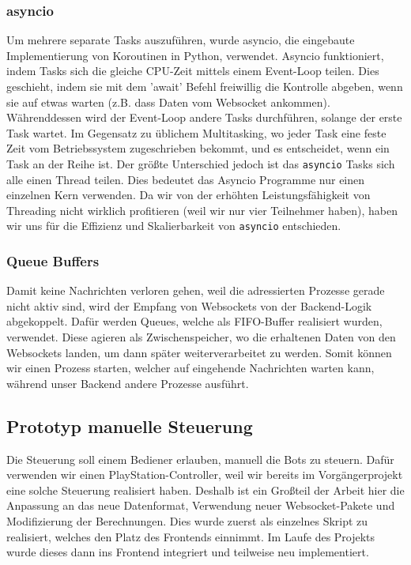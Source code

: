 
\subsubsection{asyncio}
Um mehrere separate Tasks auszuführen, wurde asyncio,
die eingebaute Implementierung von Koroutinen in Python, verwendet.
% 
Asyncio funktioniert, 
indem Tasks sich die gleiche CPU-Zeit mittels einem Event-Loop teilen.
%
Dies geschieht, indem sie mit dem 'await' Befehl freiwillig die Kontrolle abgeben,
wenn sie auf etwas warten (z.B. dass Daten vom Websocket ankommen).
%
Währenddessen wird der Event-Loop andere Tasks durchführen, 
solange der erste Task wartet.
%
Im Gegensatz zu üblichem Multitasking,
wo jeder Task eine feste Zeit vom Betriebssystem zugeschrieben bekommt, 
und es entscheidet, wenn ein Task an der Reihe ist.
% 
Der größte Unterschied jedoch ist das \texttt{asyncio} Tasks sich alle einen Thread teilen.
%
Dies bedeutet das Asyncio Programme nur einen einzelnen Kern verwenden.
% 
Da wir von der erhöhten Leistungsfähigkeit von Threading nicht wirklich profitieren
(weil wir nur vier Teilnehmer haben),
haben wir uns für die Effizienz und Skalierbarkeit von \texttt{asyncio} entschieden.


\subsubsection{Queue Buffers}
Damit keine Nachrichten verloren gehen, 
weil die adressierten Prozesse gerade nicht aktiv sind,  
wird der Empfang von Websockets von der Backend-Logik abgekoppelt.
%
Dafür werden Queues, welche als FIFO-Buffer realisiert wurden,
verwendet. Diese agieren als Zwischenspeicher, 
wo die erhaltenen Daten von den Websockets landen, 
um dann später weiterverarbeitet zu werden.
% 
Somit können wir einen Prozess starten, 
welcher auf eingehende Nachrichten warten kann,
während unser Backend andere Prozesse ausführt.

\subsection{Prototyp manuelle Steuerung}
Die Steuerung soll einem Bediener erlauben,
manuell die Bots zu steuern. 
% 
Dafür verwenden wir einen PlayStation-Controller, 
weil wir bereits im Vorgängerprojekt
eine solche Steuerung realisiert haben.
%
Deshalb ist ein Großteil der Arbeit hier die Anpassung an das neue Datenformat, 
Verwendung neuer Websocket-Pakete und Modifizierung der Berechnungen.
% 
Dies wurde zuerst als einzelnes Skript zu realisiert, 
welches den Platz des Frontends einnimmt. 
Im Laufe des Projekts wurde dieses dann ins Frontend integriert und teilweise neu implementiert.

